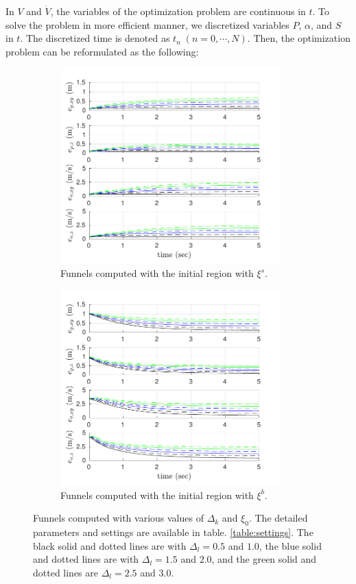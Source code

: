 \documentclass[letterpaper, 10 pt, conference]{ieeeconf}  %
\begin{document}
In $V$ and $\dot{V}$, the variables of the optimization problem are continuous in $t$. 
To solve the problem in more efficient manner, 
we discretized variables $P$, $\alpha$, and $S$ in $t$.
The discretized time is denoted as $t_n\;(n=0,\cdots,N)$. 
Then, the optimization problem can be reformulated as the following:
\begin{figure}[t]
\begin{subfigure}[b]{0.5\textwidth}
\centering
\includegraphics[width=8.5cm]{s2b_ver3.pdf}
\caption{Funnels computed with the initial region with $\xi^s$.}
\end{subfigure}
\begin{subfigure}[b]{0.5\textwidth}
\centering
\includegraphics[width=8.5cm]{b2s_ver3.pdf}
\caption{Funnels computed with the initial region with $\xi^b$.}
\end{subfigure}
\caption{
Funnels computed with various values of $\Delta_k$ and $\xi_0$. The detailed parameters and settings are available in table. \ref{table:settings}. The black solid and dotted lines are with $\Delta_l = 0.5$ and $1.0$, the blue solid and dotted lines are with $\Delta_l = 1.5$ and $2.0$, and the green solid and dotted lines are $\Delta_l = 2.5$ and $3.0$.}
\label{fig:funnelSamples}
\end{figure}
\end{document}
